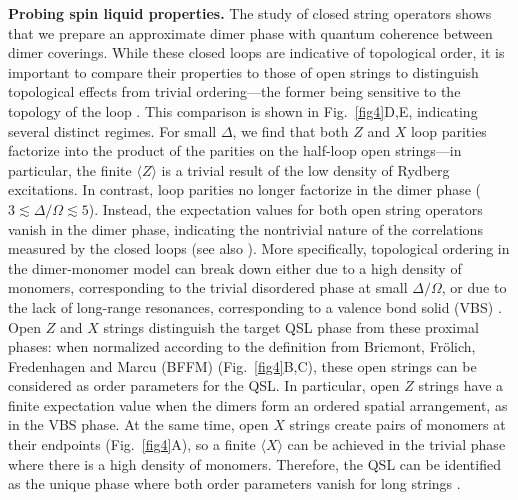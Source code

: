 \documentclass[twocolumn,amssymb,secnumarabic, prl, aps, nofootinbib]{revtex4-1}
\begin{document}
\noindent \textbf{Probing spin liquid properties.}
The study of closed string operators shows that we prepare an approximate dimer phase with quantum coherence between dimer coverings.
While these closed loops are indicative of topological order, it is important to compare their properties to those of open strings to distinguish topological effects from trivial ordering---the former being sensitive to the topology of the loop \cite{BF1983,FM1983,Gregor11}.
This comparison is shown in  Fig.~\ref{fig4}D,E, indicating several distinct regimes.  
For small $\Delta$, we find that both $Z$ and $X$ loop parities factorize into the product of the parities on the half-loop open strings---in particular,
the finite $\langle Z \rangle$ is a trivial result of the low density of Rydberg excitations. In contrast, loop parities no longer factorize 
in the dimer phase ($3\lesssim \Delta/\Omega \lesssim 5$). Instead, the expectation values for both open string operators vanish in the dimer phase, indicating the nontrivial nature of the correlations measured by the closed loops (see also \cite{Supplement}). More specifically, 
topological ordering in the dimer-monomer model can break down either due to a high density of monomers, corresponding to the trivial disordered phase at small $\Delta/\Omega$, or due to the lack of long-range resonances, corresponding to a valence bond solid (VBS) \cite{Ruben2020}.
Open $Z$ and $X$ strings distinguish the target QSL phase from these proximal phases:  when normalized according to the definition from Bricmont, Fr{\"o}lich, Fredenhagen and Marcu \cite{BF1983,FM1983} (BFFM) (Fig.~\ref{fig4}B,C), these open strings can be considered as order parameters for the QSL. In particular, open $Z$ strings have a finite expectation value when the dimers form an ordered spatial arrangement, as in the VBS phase. At the same time, open $X$ strings create pairs of monomers at their endpoints (Fig.~\ref{fig4}A), so a finite $\langle X \rangle$ can be achieved in the trivial phase where there is a high density of monomers. 
Therefore, the QSL can be identified as the unique phase where both order parameters vanish for long strings \cite{Ruben2020}.
\end{document}
